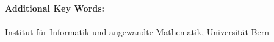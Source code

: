 \documentclass[12pt,a4paper,twoside]{_sty/iam_tr}
\begin{document}
\textbf{Additional Key Words:}\\ 
\repkeywords \\[1cm]
{\small Institut f\"ur Informatik und angewandte Mathematik, Universit\"at Bern}
\cleardoublepage %
\tableofcontents
\newpage %
~
\cleardoublepage %
\setcounter{page}{1}
\pagestyle{myheadings}
\repsections
\end{document}
